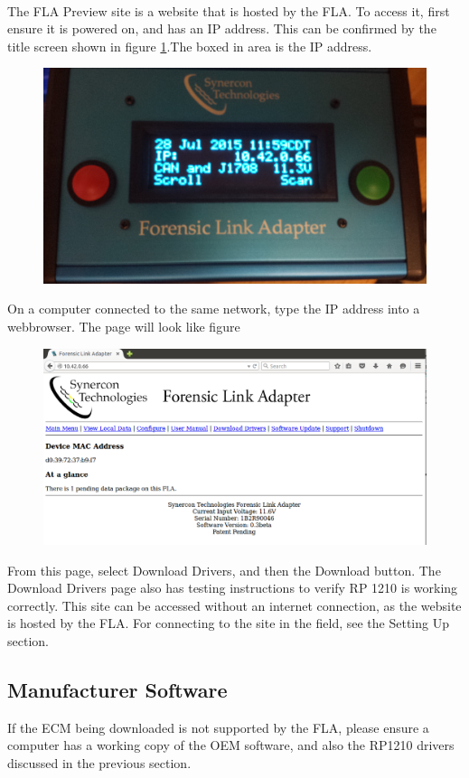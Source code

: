 \documentclass[11pt]{article}
\begin{document}
\paragraph{  }
The FLA Preview site is a website that is hosted by the FLA. To access it, first ensure it is powered on, and has an IP address. This can be confirmed by the title screen shown in figure \ref{fig:fla_title_screen}.The boxed in area is the IP address.
\begin{figure}[tbph]
\centering
\includegraphics[width=0.5\linewidth]{./fla_screens/title_screen}
\label{fig:fla_title_screen}
\caption{}
\end{figure}
On a computer connected to the same network, type the IP address into a webbrowser. The page will look like figure 
\begin{figure}[tbph]
\centering
\includegraphics[width=1\linewidth]{./fla_site/main_page}
\label{fig:preview_main_page}
\caption{}
\end{figure}
From this page, select Download Drivers, and then the Download button. The Download Drivers page also has testing instructions to verify RP 1210 is working correctly. This site can be accessed without an internet connection, as the website is hosted by the FLA. For connecting to the site in the field, see the Setting Up section.
\subsection{Manufacturer Software}
If the ECM being downloaded is not supported by the FLA, please ensure a computer has a working copy of the OEM software, and also the RP1210 drivers discussed in the previous section.
\end{document}
